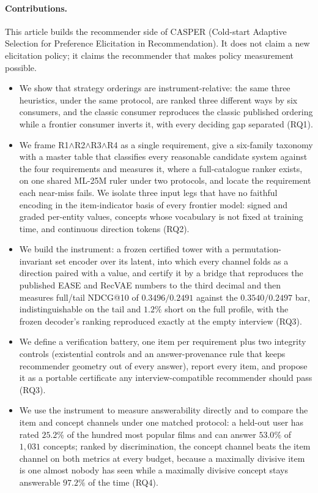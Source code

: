 \documentclass[acmsmall,review,anonymous]{acmart}
\begin{document}
\paragraph{Contributions.} This article builds the recommender side of CASPER (Cold-start Adaptive Selection for Preference Elicitation in Recommendation). It does not claim a new elicitation policy; it claims the recommender that makes policy measurement possible.
\begin{itemize}[leftmargin=1.4em,itemsep=2pt]
  \item We show that strategy orderings are instrument-relative: the same three heuristics, under the same protocol, are ranked three different ways by six consumers, and the classic consumer reproduces the classic published ordering while a frontier consumer inverts it, with every deciding gap separated (RQ1).
  \item We frame R1$\wedge$R2$\wedge$R3$\wedge$R4 as a single requirement, give a six-family taxonomy with a master table that classifies every reasonable candidate system against the four requirements and measures it, where a full-catalogue ranker exists, on one shared ML-25M ruler under two protocols, and locate the requirement each near-miss fails. We isolate three input legs that have no faithful encoding in the item-indicator basis of every frontier model: signed and graded per-entity values, concepts whose vocabulary is not fixed at training time, and continuous direction tokens (RQ2).
  \item We build the instrument: a frozen certified tower with a permutation-invariant set encoder over its latent, into which every channel folds as a direction paired with a value, and certify it by a bridge that reproduces the published EASE and RecVAE numbers to the third decimal and then measures full/tail NDCG@10 of $0.3496/0.2491$ against the $0.3540/0.2497$ bar, indistinguishable on the tail and $1.2\%$ short on the full profile, with the frozen decoder's ranking reproduced exactly at the empty interview (RQ3).
  \item We define a verification battery, one item per requirement plus two integrity controls (existential controls and an answer-provenance rule that keeps recommender geometry out of every answer), report every item, and propose it as a portable certificate any interview-compatible recommender should pass (RQ3).
  \item We use the instrument to measure answerability directly and to compare the item and concept channels under one matched protocol: a held-out user has rated $25.2\%$ of the hundred most popular films and can answer $53.0\%$ of $1{,}031$ concepts; ranked by discrimination, the concept channel beats the item channel on both metrics at every budget, because a maximally divisive item is one almost nobody has seen while a maximally divisive concept stays answerable $97.2\%$ of the time (RQ4).
\end{itemize}
\end{document}
